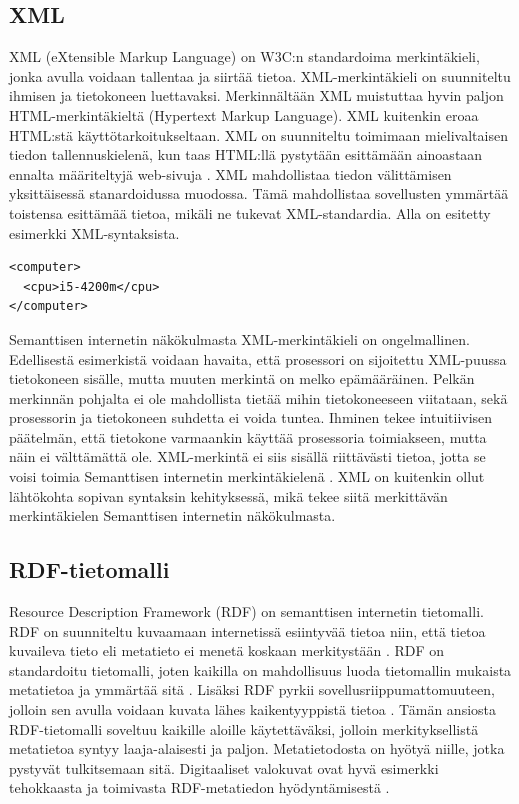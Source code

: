 \documentclass[finnish, 12pt, a4paper, elec, utf8, pdfa, online]{aaltothesis}
\begin{document}
\subsection{XML}
XML (eXtensible Markup Language) on W3C:n standardoima merkintäkieli, jonka avulla voidaan tallentaa ja siirtää tietoa. XML-merkintäkieli on suunniteltu ihmisen ja tietokoneen luettavaksi. Merkinnältään XML muistuttaa hyvin paljon HTML-merkintäkieltä (Hypertext Markup Language). XML kuitenkin eroaa HTML:stä käyttötarkoitukseltaan. XML on suunniteltu toimimaan mielivaltaisen tiedon tallennuskielenä, kun taas HTML:llä pystytään esittämään ainoastaan ennalta määriteltyjä web-sivuja \cite{IEEE_XML}. XML mahdollistaa tiedon välittämisen yksittäisessä stanardoidussa muodossa. Tämä mahdollistaa sovellusten ymmärtää toistensa esittämää tietoa, mikäli ne tukevat XML-standardia. Alla on esitetty esimerkki XML-syntaksista.

\begin{lstlisting}[style=codeblock,caption={XML-syntaksiesimerkki.},captionpos=b,label={xml-esim}]
<computer>
  <cpu>i5-4200m</cpu>
</computer>
\end{lstlisting}

 Semanttisen internetin näkökulmasta XML-merkintäkieli on ongelmallinen. Edellisestä esimerkistä voidaan havaita, että prosessori on sijoitettu XML-puussa tietokoneen sisälle, mutta muuten merkintä on melko epämääräinen. Pelkän merkinnän pohjalta ei ole mahdollista tietää mihin tietokoneeseen viitataan, sekä prosessorin ja tietokoneen suhdetta ei voida tuntea. Ihminen tekee intuitiivisen päätelmän, että tietokone varmaankin käyttää prosessoria toimiakseen, mutta näin ei välttämättä ole. XML-merkintä ei siis sisällä riittävästi tietoa, jotta se voisi toimia Semanttisen internetin merkintäkielenä \cite{IEEE_XML}. XML on kuitenkin ollut lähtökohta sopivan syntaksin kehityksessä, mikä tekee siitä merkittävän merkintäkielen Semanttisen internetin näkökulmasta.


\subsection{RDF-tietomalli}
Resource Description Framework (RDF) on semanttisen internetin tietomalli. RDF on suunniteltu kuvaamaan internetissä esiintyvää tietoa niin, että tietoa kuvaileva tieto eli metatieto ei menetä koskaan merkitystään \cite{RDF_specification}. RDF on standardoitu tietomalli, joten kaikilla on mahdollisuus luoda tietomallin mukaista metatietoa ja ymmärtää sitä \cite{metadata}. Lisäksi RDF pyrkii sovellusriippumattomuuteen, jolloin sen avulla voidaan kuvata lähes kaikentyyppistä tietoa \cite{RDF_specification}. Tämän ansiosta RDF-tietomalli soveltuu kaikille aloille käytettäväksi, jolloin merkityksellistä metatietoa syntyy laaja-alaisesti ja paljon. Metatietodosta on hyötyä niille, jotka pystyvät tulkitsemaan sitä. Digitaaliset valokuvat ovat hyvä esimerkki tehokkaasta ja toimivasta RDF-metatiedon hyödyntämisestä \cite{XMP1} \cite{profium_metadata}.
\end{document}
